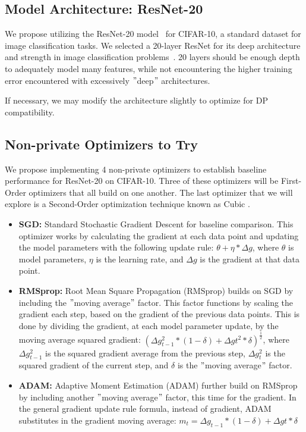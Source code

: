 \subsection{Model Architecture: ResNet-20}\label{subsec:model-architecture:-resnet-20}


We propose utilizing the ResNet-20 model~\cite{Idelbayev_ResNet20} for CIFAR-10,
a standard dataset for image classification tasks.
We selected a 20-layer ResNet for its deep architecture and strength in image classification problems~\cite{DBLP:journals/corr/HeZRS15}.
20
layers should be enough depth to adequately model many features, while not encountering the higher training error encountered
with excessively \("\)deep\("\) architectures. \cite{DBLP:journals/corr/HeZRS15}

If necessary, we may modify the architecture slightly to optimize for DP compatibility.

\subsection{Non-private Optimizers to Try}\label{subsec:non-private-optimizers-to-try}
We propose implementing 4 non-private optimizers to establish baseline performance for ResNet-20 on CIFAR-10.
Three of these optimizers will be First-Order optimizers
that all build on one another.
The last optimizer that we will explore is a Second-Order optimization technique known as Cubic .

\begin{itemize}
    \item \textbf{SGD:} Standard Stochastic Gradient Descent for baseline comparison.
    This optimizer works by calculating the gradient at each data
    point and updating the model parameters with the following update rule: $\theta + \eta * \Delta g$, where $\theta$ is model parameters, $\eta$ is
    the learning rate, and $\Delta g$ is the gradient at that data point.
    \item \textbf{RMSprop:} Root Mean Square Propagation (RMSprop) builds on SGD by including the \("\)moving average\("\) factor.
    This factor functions by scaling the gradient
    each step, based on the gradient of the previous data points.
    This is done by dividing the gradient, at each model parameter update,
    by the moving average squared gradient: $(\Delta g_{t-1}^{2} * (1-\delta) + \Delta g{t}^{2}*\delta)^{\frac{1}{2}}$,
    where $\Delta g_{t-1}^{2}$ is the squared gradient average from the previous step, $\Delta g_{t}^{2}$ is
    the squared gradient of the current step, and $\delta$ is the \("\)moving average\("\) factor.  \cite{DBLP:journals/corr/abs-1807-06766,Jason_Huang_2020}
    \item \textbf{ADAM:} Adaptive Moment Estimation (ADAM) further build on RMSprop by including another \("\)moving average\("\) factor, this time for the gradient.
    In the general gradient update rule formula, instead of gradient,
    ADAM substitutes in the gradient moving average: $m_{t} = \Delta g_{t-1} * (1-\delta) + \Delta g{t}*\delta$~\cite{DBLP:journals/corr/abs-1807-06766}
\end{itemize}

